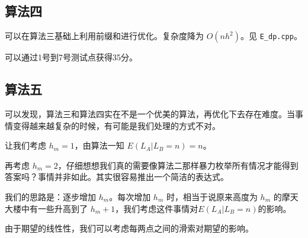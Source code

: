 \documentclass[11pt, a4paper]{article}
\begin{document}
\subsection*{算法四}
可以在算法三基础上利用前缀和进行优化。复杂度降为 $O(n h^2)$。见 \texttt{E\_dp.cpp}。

可以通过1号到7号测试点获得35分。

\subsection*{算法五}
可以发现，算法三和算法四实在不是一个优美的算法，再优化下去存在难度。当事情变得越来越复杂的时候，有可能是我们处理的方式不对。

让我们考虑 $h_m = 1$，由算法一知 $E(L_A | L_B = n) = n$。

再考虑 $h_m = 2$，仔细想想我们真的需要像算法二那样暴力枚举所有情况才能得到答案吗？事情并非如此。其实很容易推出一个简洁的表达式。

我们的思路是：逐步增加 $h_m$。每次增加 $h_m$ 时，相当于说原来高度为 $h_m$ 的摩天大楼中有一些升高到了 $h_m + 1$，我们考虑这件事情对$E(L_A | L_B = n)$的影响。

由于期望的线性性，我们可以考虑每两点之间的滑索对期望的影响。
\end{document}
